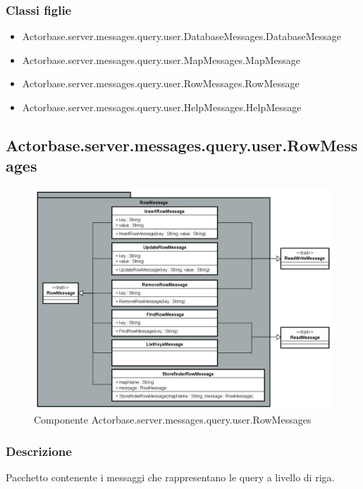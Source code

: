 \documentclass[a4paper]{article}
\begin{document}
			\subsubsection{Classi figlie}
				\begin{itemize}
					\item Actorbase.server.messages.query.user.DatabaseMessages.DatabaseMessage
					\item Actorbase.server.messages.query.user.MapMessages.MapMessage
					\item Actorbase.server.messages.query.user.RowMessages.RowMessage
					\item Actorbase.server.messages.query.user.HelpMessages.HelpMessage
				\end{itemize}
		
		\subsection{Actorbase.server.messages.query.user.RowMessages}
		
			\begin{figure}[H]
				\centering
				\includegraphics[width=\textwidth]{ST/Server/rowMessagesLevel.jpg}
				\caption{Componente Actorbase.server.messages.query.user.RowMessages}
			\end{figure}
			
			\subsubsection{Descrizione}
				Pacchetto contenente i messaggi che rappresentano le query a livello di riga.
				
\end{document}
